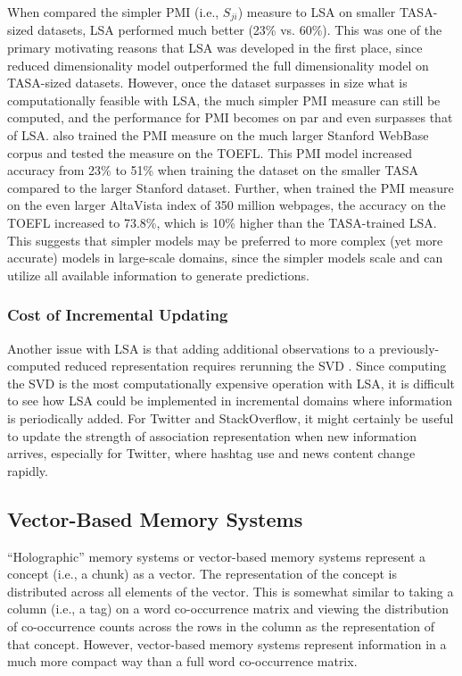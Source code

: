 \documentclass[man,floatsintext,donotrepeattitle]{apa6}
\begin{document}
When \textcite{Budiu2007} compared the simpler PMI (i.e., $S_{ji}$) measure to LSA on smaller TASA-sized datasets, LSA performed much better (23\% vs. 60\%).
This was one of the primary motivating reasons that LSA was developed in the first place, since reduced dimensionality model outperformed the full dimensionality model on TASA-sized datasets.
However, once the dataset surpasses in size what is computationally feasible with LSA, the much simpler PMI measure can still be computed, and the performance for PMI becomes on par and even surpasses that of LSA.
\textcite{Budiu2007} also trained the PMI measure on the much larger Stanford WebBase corpus and tested the measure on the TOEFL.
This PMI model increased accuracy from 23\% to 51\% when training the dataset on the smaller TASA compared to the larger Stanford dataset.
Further, when \textcite{Turney2001} trained the PMI measure on the even larger AltaVista index of 350 million webpages, the accuracy on the TOEFL increased to \num{73.8}\%, which is 10\% higher than the TASA-trained LSA.
This suggests that simpler models may be preferred to more complex (yet more accurate) models in large-scale domains, since the simpler models scale and can utilize all available information to generate predictions.

\subsubsection{Cost of Incremental Updating}

Another issue with LSA is that adding additional observations to a previously-computed reduced representation requires rerunning the SVD \parencite{Farahat2004}.
Since computing the SVD is the most computationally expensive operation with LSA, it is difficult to see how LSA could be implemented in incremental domains where information is periodically added.
For Twitter and StackOverflow, it might certainly be useful to update the strength of association representation when new information arrives, especially for Twitter, where hashtag use and news content change rapidly.

\subsection{Vector-Based Memory Systems}

``Holographic'' memory systems \parencite{Plate1995} or vector-based memory systems represent a concept (i.e., a chunk) as a vector.
The representation of the concept is distributed across all elements of the vector.
This is somewhat similar to taking a column (i.e., a tag) on a word co-occurrence matrix and viewing the distribution of co-occurrence counts across the rows in the column as the representation of that concept.
However, vector-based memory systems represent information in a much more compact way than a full word co-occurrence matrix.
\end{document}
